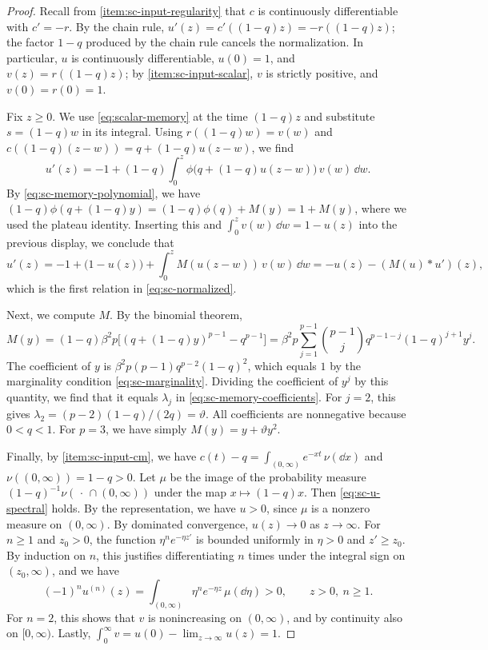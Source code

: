 \begin{proof}
Recall from \ref{item:sc-input-regularity} that $c$ is continuously differentiable with $c'=-r$. By the chain rule, $u'(z)=c'((1-q)z)=-r((1-q)z)$; the factor $1-q$ produced by the chain rule cancels the normalization. In particular, $u$ is continuously differentiable, $u(0)=1$, and $v(z)=r((1-q)z)$; by \ref{item:sc-input-scalar}, $v$ is strictly positive, and $v(0)=r(0)=1$.

Fix $z\ge0$. We use \eqref{eq:scalar-memory} at the time $(1-q)z$ and substitute $s=(1-q)w$ in its integral. Using $r((1-q)w)=v(w)$ and $c((1-q)(z-w))=q+(1-q)u(z-w)$, we find
\[
 u'(z)=-1+(1-q)\int_0^z\phi\bigl(q+(1-q)u(z-w)\bigr)\,v(w)\,\dd w .
\]
By \eqref{eq:sc-memory-polynomial}, we have $(1-q)\phi(q+(1-q)y)=(1-q)\phi(q)+M(y)=1+M(y)$, where we used the plateau identity. Inserting this and $\int_0^zv(w)\,\dd w=1-u(z)$ into the previous display, we conclude that
\[
 u'(z)=-1+\bigl(1-u(z)\bigr)+\int_0^zM(u(z-w))\,v(w)\,\dd w
 =-u(z)-(M(u)*u')(z),
\]
which is the first relation in \eqref{eq:sc-normalized}.

Next, we compute $M$. By the binomial theorem,
\[
 M(y)=(1-q)\beta^2p\bigl[(q+(1-q)y)^{p-1}-q^{p-1}\bigr]
 =\beta^2p\sum_{j=1}^{p-1}\binom{p-1}{j}q^{p-1-j}(1-q)^{j+1}y^j .
\]
The coefficient of $y$ is $\beta^2p(p-1)q^{p-2}(1-q)^2$, which equals $1$ by the marginality condition \eqref{eq:sc-marginality}. Dividing the coefficient of $y^j$ by this quantity, we find that it equals $\lambda_j$ in \eqref{eq:sc-memory-coefficients}. For $j=2$, this gives $\lambda_2=(p-2)(1-q)/(2q)=\vartheta$. All coefficients are nonnegative because $0<q<1$. For $p=3$, we have simply $M(y)=y+\vartheta y^2$.

Finally, by \ref{item:sc-input-cm}, we have $c(t)-q=\int_{(0,\infty)}e^{-xt}\,\nu(\dd x)$ and $\nu((0,\infty))=1-q>0$. Let $\mu$ be the image of the probability measure $(1-q)^{-1}\nu(\,\cdot\,\cap(0,\infty))$ under the map $x\mapsto(1-q)x$. Then \eqref{eq:sc-u-spectral} holds. By the representation, we have $u>0$, since $\mu$ is a nonzero measure on $(0,\infty)$. By dominated convergence, $u(z)\to0$ as $z\to\infty$. For $n\ge1$ and $z_0>0$, the function $\eta^ne^{-\eta z'}$ is bounded uniformly in $\eta>0$ and $z'\ge z_0$. By induction on $n$, this justifies differentiating $n$ times under the integral sign on $(z_0,\infty)$, and we have
\[
 (-1)^nu^{(n)}(z)=\int_{(0,\infty)}\eta^ne^{-\eta z}\,\mu(\dd\eta)>0,\qquad z>0,\ n\ge1 .
\]
For $n=2$, this shows that $v$ is nonincreasing on $(0,\infty)$, and by continuity also on $[0,\infty)$. Lastly, $\int_0^\infty v=u(0)-\lim_{z\to\infty}u(z)=1$.
\end{proof}

